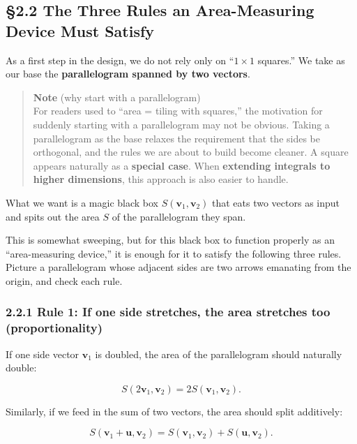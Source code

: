 \hypertarget{the-three-rules-an-area-measuring-device-must-satisfy}{%
\subsection{§2.2 The Three Rules an Area-Measuring Device Must
Satisfy}\label{the-three-rules-an-area-measuring-device-must-satisfy}}

As a first step in the design, we do not rely only on ``\(1\times 1\)
squares.'' We take as our base the
\textbf{parallelogram spanned by two vectors}.

\begin{quote}
\textbf{Note} (why start with a parallelogram)\\
For readers used to ``area = tiling with squares,'' the motivation for
suddenly starting with a parallelogram may not be obvious. Taking a
parallelogram as the base relaxes the requirement that the sides be
orthogonal, and the rules we are about to build become cleaner. A square
appears naturally as a \textbf{special case}. When
\textbf{extending integrals to higher dimensions}, this approach is also
easier to handle.
\end{quote}

What we want is a magic black box \(S(\mathbf{v}_1,\mathbf{v}_2)\) that
eats two vectors as input and spits out the area \(S\) of the
parallelogram they span.

This is somewhat sweeping, but for this black box to function properly
as an ``area-measuring device,'' it is enough for it to satisfy the
following three rules. Picture a parallelogram whose adjacent sides are
two arrows emanating from the origin, and check each rule.

\hypertarget{rule-1-if-one-side-stretches-the-area-stretches-too-proportionality}{%
\subsubsection{2.2.1 Rule 1: If one side stretches, the area stretches
too
(proportionality)}\label{rule-1-if-one-side-stretches-the-area-stretches-too-proportionality}}

If one side vector \(\mathbf{v}_1\) is doubled, the area of the
parallelogram should naturally double:

\[S(2\mathbf{v}_1,\mathbf{v}_2)=2S(\mathbf{v}_1,\mathbf{v}_2).\]

Similarly, if we feed in the sum of two vectors, the area should split
additively:

\[S(\mathbf{v}_1+\mathbf{u},\mathbf{v}_2)=S(\mathbf{v}_1,\mathbf{v}_2)+S(\mathbf{u},\mathbf{v}_2).\]

